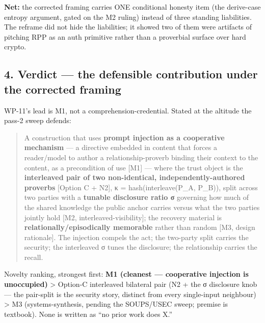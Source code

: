 \documentclass[
  11pt,
]{article}
\begin{document}
\textbf{Net:} the corrected framing carries ONE conditional honesty item
(the derive-case entropy argument, gated on the M2 ruling) instead of
three standing liabilities. The reframe did not hide the liabilities; it
showed two of them were artifacts of pitching RPP as an auth primitive
rather than a proverbial surface over hard crypto.

\subsection{4. Verdict --- the defensible contribution under the
corrected
framing}\label{verdict-the-defensible-contribution-under-the-corrected-framing}

WP-11's lead is M1, not a comprehension-credential. Stated at the
altitude the pass-2 sweep defends:

\begin{quote}
A construction that uses \textbf{prompt injection as a cooperative
mechanism} --- a directive embedded in content that forces a
reader/model to author a relationship-proverb binding their context to
the content, as a precondition of use {[}M1{]} --- where the trust
object is the \textbf{interleaved pair of two non-identical,
independently-authored proverbs} {[}Option C + N2{]}, κ =
hash(interleave(P\_A, P\_B)), split across two parties with a
\textbf{tunable disclosure ratio σ} governing how much of the shared
knowledge the public anchor carries versus what the two parties jointly
hold {[}M2, interleaved-visibility{]}; the recovery material is
\textbf{relationally/episodically memorable} rather than random {[}M3,
design rationale{]}. The injection compels the act; the two-party split
carries the security; the interleaved σ tunes the disclosure; the
relationship carries the recall.
\end{quote}

Novelty ranking, strongest first: \textbf{M1 (cleanest --- cooperative
injection is unoccupied)} \textgreater{} Option-C interleaved bilateral
pair (N2 + the σ disclosure knob --- the pair-split is the security
story, distinct from every single-input neighbour) \textgreater{} M3
(systems-synthesis, pending the SOUPS/USEC sweep; premise is textbook).
None is written as ``no prior work does X.''
\end{document}
